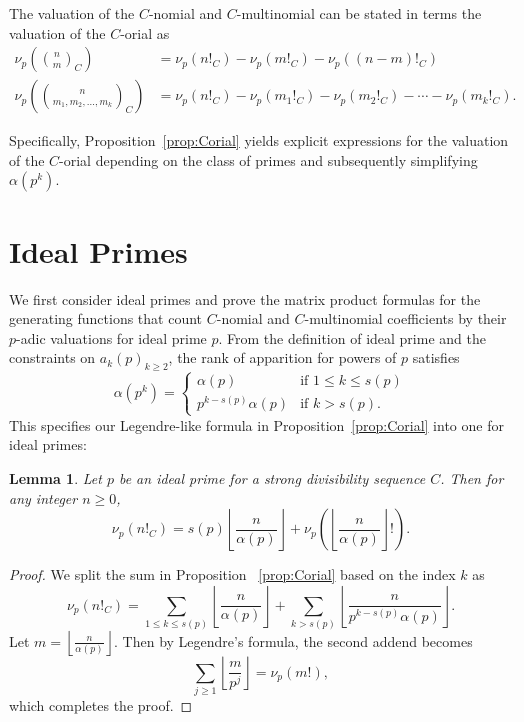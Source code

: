 \documentclass{amsart}
\newtheorem{lemma}[theorem]{Lemma}
\theoremstyle{definition}
\begin{document}
The valuation of the $C$-nomial and $C$-multinomial can be stated in terms the valuation of the $C$-orial as 
\begin{align*}
\nu_p\!\left(\binom{n}{m}_{\!C}\right) &= \nu_p(n!_C)-\nu_p(m!_C)-\nu_p((n-m)!_C)\\
\nu_p\!\left(\binom{n}{m_1,m_2,\dots,m_k}_C \right) &= \nu_p(n!_C)-\nu_p(m_1!_C)-\nu_p(m_2!_C)-\cdots-\nu_p(m_k!_C).
\end{align*}

Specifically, Proposition~\ref{prop:Corial} yields explicit expressions for the valuation of the $ C $-orial depending on the class of primes and subsequently simplifying $\alpha(p^k)$.  

\section{Ideal Primes}\label{section:ideal} We first consider ideal primes and prove the matrix product formulas for the generating functions that count $C$-nomial and $C$-multinomial coefficients by their $p$-adic valuations for ideal prime $p$. From the definition of ideal prime and the constraints on $a_k(p)_{k\geq2}$, the rank of apparition for powers of $p$ satisfies \[
\alpha(p^k) =
\begin{cases}
\alpha(p) & \text{if } 1 \leq k \leq s(p) \\
p^{k - s(p)} \alpha(p) & \text{if } k > s(p).
\end{cases}
\]
This specifies our Legendre-like formula in Proposition~\ref{prop:Corial} into one for ideal primes:

\begin{lemma} %
\label{lemma:idealCorial}
Let $ p $ be an ideal prime for a strong divisibility sequence $ C $. Then for any integer $ n \geq 0 $,
\[
\nu_p(n!_C) = s(p) \left\lfloor \frac{n}{\alpha(p)} \right\rfloor + \nu_p\!\left( \left\lfloor \frac{n}{\alpha(p)} \right\rfloor ! \right).
\]
\end{lemma}

\begin{proof}

We split the sum in Proposition ~\ref{prop:Corial} based on the index $k$ as
\[
\nu_p(n!_C) = \sum_{1 \leq k \leq s(p)} \left\lfloor \frac{n}{\alpha(p)} \right\rfloor + \sum_{k > s(p)} \left\lfloor \frac{n}{p^{k - s(p)} \alpha(p)} \right\rfloor.
\]
Let $ m = \left\lfloor \frac{n}{\alpha(p)} \right\rfloor $. Then by Legendre's formula, the second addend becomes
\[
\sum_{j \geq 1} \left\lfloor \frac{m}{p^j} \right\rfloor = \nu_p(m!),
\]
which completes the proof.
\end{proof}
\end{document}

